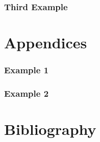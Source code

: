 \documentclass[12pt]{article}
\begin{document}
\blindtext 







\section{Third Example}\label{Sec: Third Example}

\blindtext 







\newpage
\appendix
\renewcommand{\thesection}{\Alph{section}}
\renewcommand{\thesubsection}{\roman{subsection}}
\renewcommand{\theequation}{A-\arabic{equation}}

\part*{Appendices}


\section{Example 1}

\section{Example 2}


\newpage
\part*{Bibliography}

\end{document}
